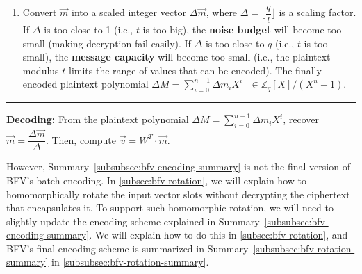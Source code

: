 \begin{tcolorbox}[title={\textbf{\tboxlabel{\ref*{subsubsec:bfv-encoding-summary}} BFV's Encoding and Decoding}}]
\begin{enumerate}
$ $

\item Convert $\vec{m}$ into a scaled integer vector $\Delta\vec{m}$, where $\Delta=\lfloor \dfrac{q}{t}\rfloor$ is a scaling factor. If $\Delta$ is too close to 1 (i.e., $t$ is too big), the \textbf{noise budget} will become too small (making decryption fail easily). If $\Delta$ is too close to $q$ (i.e., $t$ is too small), the \textbf{message capacity} will become too small (i.e., the plaintext modulus $t$ limits the range of values that can be encoded). The finally encoded plaintext polynomial $\Delta M = \sum\limits_{i=0}^{n-1} \Delta m_i X^i \text{ } \in \mathbb{Z}_q[X] / (X^n + 1)$. %

\end{enumerate}

\par\noindent\rule{\textwidth}{0.4pt}

\textbf{\underline{Decoding}:} From the plaintext polynomial $\Delta M = \sum\limits_{i=0}^{n-1}\Delta m_iX^i$, recover $\vec{m} = \dfrac{\Delta \vec{m}}{\Delta}$. Then,
compute $\vec{v} = W^T \cdot \vec{m}$.

\end{tcolorbox}



However, Summary~\ref*{subsubsec:bfv-encoding-summary} is not the final version of BFV's batch encoding. In \autoref{subsec:bfv-rotation}, we will explain how to homomorphically rotate the input vector slots without decrypting the ciphertext that encapsulates it. To support such homomorphic rotation, we will need to slightly update the encoding scheme explained in Summary~\ref*{subsubsec:bfv-encoding-summary}. We will explain how to do this in \autoref{subsec:bfv-rotation}, and BFV's final encoding scheme is summarized in Summary~\ref*{subsubsec:bfv-rotation-summary} in \autoref{subsubsec:bfv-rotation-summary}.


